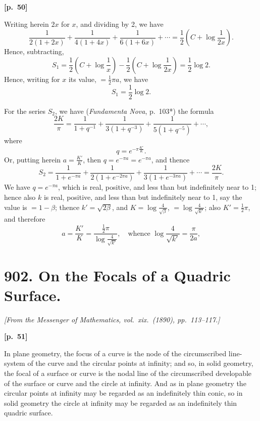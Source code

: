 \documentclass[11pt,a4paper]{book}
\begin{document}
\vspace{0.5em}
\noindent\textbf{[p.\ 50]}

Writing herein $2x$ for $x$, and dividing by 2, we have
$$
\frac{1}{2(1 + 2x)} + \frac{1}{4(1 + 4x)} + \frac{1}{6(1 + 6x)} + \cdots = \frac{1}{2}\left(C + \log\frac{1}{2x}\right).
$$
Hence, subtracting,
$$
S_1 = \frac{1}{2}\left(C + \log\frac{1}{x}\right) - \frac{1}{2}\left(C + \log\frac{1}{2x}\right) = \frac{1}{2}\log 2.
$$
Hence, writing for $x$ its value, $= \frac{1}{2}\pi a$, we have
$$
S_1 = \frac{1}{2}\log 2.
$$

For the series $S_2$, we have (\textit{Fundamenta Nova}, p.\ 103*) the formula
$$
\frac{2K}{\pi} = \frac{1}{1 + q^{-1}} + \frac{1}{3(1 + q^{-3})} + \frac{1}{5(1 + q^{-5})} + \cdots,
$$
where
$$
q = e^{-\pi\frac{K'}{K}}.
$$
Or, putting herein $a = \frac{K'}{K}$, then $q = e^{-\pi a} = e^{-\pi a}$, and thence
$$
S_2 = \frac{1}{1 + e^{-\pi a}} + \frac{1}{2(1 + e^{-2\pi a})} + \frac{1}{3(1 + e^{-3\pi a})} + \cdots = \frac{2K}{\pi}.
$$
We have $q = e^{-\pi a}$, which is real, positive, and less than but indefinitely near to 1; hence also $k$ is real, positive, and less than but indefinitely near to 1, say the value is $= 1 - \beta$; thence $k' = \sqrt{2\beta}$, and $K = \log\frac{4}{\sqrt{\beta}}$, $= \log\frac{4}{\sqrt{k'}}$; also $K' = \frac{1}{2}\pi$, and therefore
$$
a = \frac{K'}{K} = \frac{\frac{1}{2}\pi}{\log\frac{4}{\sqrt{k'}}}, \quad \text{whence } \log\frac{4}{\sqrt{k'}} = \frac{\pi}{2a},
$$

\newpage

\section*{902. On the Focals of a Quadric Surface.}

\noindent\textit{[From the Messenger of Mathematics, vol.\ xix.\ (1890), pp.\ 113--117.]}

\vspace{0.5em}
\noindent\textbf{[p.\ 51]}

In plane geometry, the focus of a curve is the node of the circumscribed line-system of the curve and the circular points at infinity; and so, in solid geometry, the focal of a surface or curve is the nodal line of the circumscribed developable of the surface or curve and the circle at infinity. And as in plane geometry the circular points at infinity may be regarded as an indefinitely thin conic, so in solid geometry the circle at infinity may be regarded as an indefinitely thin quadric surface.
\end{document}
